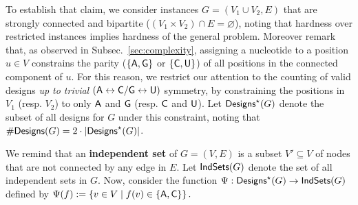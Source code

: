 \documentclass{bioinfo}
\newcommand{\Def}[1]{{\bf #1}}
\newcommand{\Design}[1]{{\sf Designs}^{\star}(#1)}
\newcommand{\NumDesign}{\ensuremath{\#}{\sf Designs}\xspace}
\newcommand{\IS}[1]{{\sf IndSets}(#1)}
\newcommand{\Nuc}[1]{{\sf #1}}
\newcommand{\Ab}{\Nuc{A}}
\newcommand{\Cb}{\Nuc{C}}
\newcommand{\Gb}{\Nuc{G}}
\newcommand{\Ub}{\Nuc{U}}
\begin{document}
To establish that claim, we consider instances $G=(V_1\cup V_2, E)$ that are  strongly connected and bipartite ($(V_1\times V_2) \cap E = \varnothing$), noting that hardness over restricted instances implies hardness of the general problem. Moreover remark that, as observed in Subsec.~\ref{sec:complexity}, assigning a nucleotide to a position $u\in V$ constrains the parity ($\{\Ab,\Gb\}$ or $\{\Cb,\Ub\}$) of all positions in the connected component of $u$. For this reason, we restrict our attention to the counting of valid designs \emph{up to trivial} $(\Ab\leftrightarrow \Cb/\Gb\leftrightarrow \Ub)$ symmetry, by constraining the positions in $V_{1}$ (resp. $V_2$) to only $\Ab$ and $\Gb$ (resp. $\Cb$ and $\Ub$). Let $\Design{G}$ denote the subset of all designs for $G$ under this constraint, noting that $\NumDesign(G) = 2\cdot|\Design{G}|$. 


We remind that an \Def{independent set} of $G=(V,E)$ is a subset $V'\subseteq V$ of nodes that are not connected by any edge in $E$. Let $\IS{G}$ denote the set of all independent sets in $G$. 
Now, consider the function $\Psi: \Design{G} \to \IS{G}$ defined by $ \Psi(f) := \left\{v\in V\mid f(v)\in\{\Ab,\Cb\}\right\}.$
\end{document}
